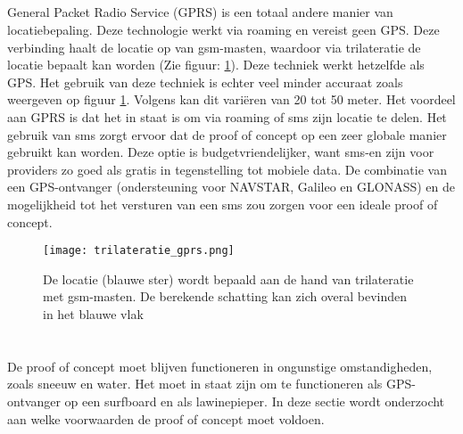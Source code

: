\subsection{}
General Packet Radio Service (GPRS) is een totaal andere manier van locatiebepaling. Deze technologie werkt via roaming en vereist geen GPS. Deze verbinding haalt de locatie op van gsm-masten, waardoor via trilateratie de locatie bepaalt kan worden (Zie figuur: \ref{fig:trilateratie_gprs}). Deze techniek werkt hetzelfde als GPS.
\newline
Het gebruik van deze techniek is echter veel minder accuraat zoals weergeven op figuur \ref{fig:trilateratie_gprs}. Volgens \cite{gprs} kan dit variëren van 20 tot 50 meter. Het voordeel aan GPRS is dat het in staat is om via roaming of sms zijn locatie te delen. Het gebruik van sms zorgt ervoor dat de proof of concept op een zeer globale manier gebruikt kan worden. Deze optie is budgetvriendelijker, want sms-en zijn voor providers zo goed als gratis in tegenstelling tot mobiele data. De combinatie van een GPS-ontvanger (ondersteuning voor NAVSTAR, Galileo en GLONASS) en de mogelijkheid tot het versturen van een sms zou zorgen voor een ideale proof of concept. 
\begin{figure}
    \texttt{[image: trilateratie\_gprs.png]}
    \caption[Trilateratie bij GPRS]{De locatie (blauwe ster) wordt bepaald aan de hand van trilateratie met gsm-masten. De berekende schatting kan zich overal bevinden in het blauwe vlak}
    \label{fig:trilateratie_gprs}
\end{figure}
\raggedbottom
\section{}
De proof of concept moet blijven functioneren in ongunstige omstandigheden, zoals sneeuw en water. Het moet in staat zijn om te functioneren als GPS-ontvanger op een surfboard en als lawinepieper. In deze sectie wordt onderzocht aan welke voorwaarden de proof of concept moet voldoen.
